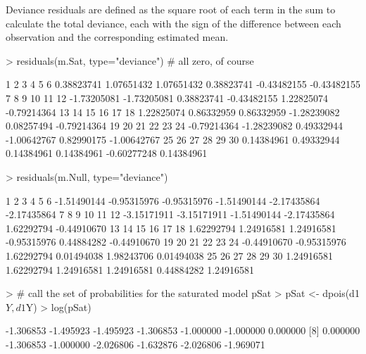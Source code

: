 \documentclass{article}
\begin{document}
Deviance residuals are defined as the square root of each term in the sum to calculate the total deviance, each with the sign of the difference between each observation and the corresponding estimated mean.
\begin{Schunk}
\begin{Sinput}
> residuals(m.Sat, type="deviance") # all zero, of course
\end{Sinput}
\begin{Soutput}
          1           2           3           4           5           6 
 0.38823741  1.07651432  1.07651432  0.38823741 -0.43482155 -0.43482155 
          7           8           9          10          11          12 
-1.73205081 -1.73205081  0.38823741 -0.43482155  1.22825074 -0.79214364 
         13          14          15          16          17          18 
 1.22825074  0.86332959  0.86332959 -1.28239082  0.08257494 -0.79214364 
         19          20          21          22          23          24 
-0.79214364 -1.28239082  0.49332944 -1.00642767  0.82990175 -1.00642767 
         25          26          27          28          29          30 
 0.14384961  0.49332944  0.14384961  0.14384961 -0.60277248  0.14384961 
\end{Soutput}
\begin{Sinput}
> residuals(m.Null, type="deviance")
\end{Sinput}
\begin{Soutput}
          1           2           3           4           5           6 
-1.51490144 -0.95315976 -0.95315976 -1.51490144 -2.17435864 -2.17435864 
          7           8           9          10          11          12 
-3.15171911 -3.15171911 -1.51490144 -2.17435864  1.62292794 -0.44910670 
         13          14          15          16          17          18 
 1.62292794  1.24916581  1.24916581 -0.95315976  0.44884282 -0.44910670 
         19          20          21          22          23          24 
-0.44910670 -0.95315976  1.62292794  0.01494038  1.98243706  0.01494038 
         25          26          27          28          29          30 
 1.24916581  1.62292794  1.24916581  1.24916581  0.44884282  1.24916581 
\end{Soutput}
\begin{Sinput}
> # call the set of probabilities for the saturated model pSat
> pSat <- dpois(d1$Y, d1$Y)
> log(pSat)
\end{Sinput}
\begin{Soutput}
 [1] -1.306853 -1.495923 -1.495923 -1.306853 -1.000000 -1.000000  0.000000
 [8]  0.000000 -1.306853 -1.000000 -2.026806 -1.632876 -2.026806 -1.969071

\end{Soutput}
\end{Schunk}
\end{document}
